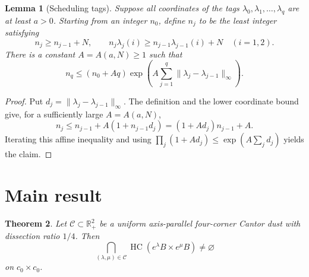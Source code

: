 \documentclass[11pt]{article}
\newtheorem{theorem}{Theorem}
\newtheorem{lemma}[theorem]{Lemma}
\newcommand{\C}{\mathcal C}
\newcommand{\R}{\mathbb R}
\newcommand{\HC}{\operatorname{HC}}
\begin{document}
\begin{lemma}[Scheduling tags]\label{lem:schedule}
Suppose all coordinates of the tags \(\lambda_0,\lambda_1,\ldots,\lambda_q\)
are at least \(a>0\).  Starting from an integer \(n_0\), define \(n_j\) to
be the least integer satisfying
\[
 n_j\geq n_{j-1}+N,\qquad
 n_j\lambda_j(i)\geq n_{j-1}\lambda_{j-1}(i)+N
 \quad(i=1,2).
\]
There is a constant \(A=A(a,N)\geq1\) such that
\[
 n_q\leq
 \left(n_0+Aq\right)
 \exp\left(A\sum_{j=1}^q
 \|\lambda_j-\lambda_{j-1}\|_\infty\right).
\]
\end{lemma}

\begin{proof}
Put \(d_j=\|\lambda_j-\lambda_{j-1}\|_\infty\).  The definition and the
lower coordinate bound give, for a sufficiently large
\(A=A(a,N)\),
\[
 n_j\leq n_{j-1}+A(1+n_{j-1}d_j)
       =(1+Ad_j)n_{j-1}+A.
\]
Iterating this affine inequality and using
\(\prod_j(1+Ad_j)\leq\exp(A\sum_jd_j)\) yields the claim.
\end{proof}

\section*{Main result}

\begin{theorem}\label{thm:main}
Let \(\C\subset\R_+^2\) be a uniform axis-parallel four-corner Cantor dust
with dissection ratio \(1/4\).  Then
\[
 \bigcap_{(\lambda,\mu)\in\C}
 \HC(e^\lambda B\times e^\mu B)\neq\varnothing
\]
on \(c_0\times c_0\).
\end{theorem}
\end{document}
